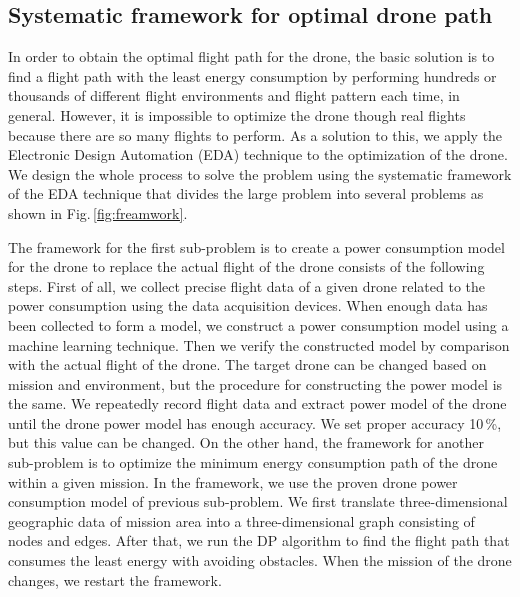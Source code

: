 \documentclass[journal]{./template/IEEEtran}
\begin{document}
\subsection {Systematic framework for optimal drone path}

In order to obtain the optimal flight path for the drone, the basic solution is to find a flight path with the least energy consumption by performing hundreds or thousands of different flight environments and flight pattern each time, in general.
However, it is impossible to optimize the drone though real flights because there are so many flights to perform.
As a solution to this, we apply the Electronic Design Automation (EDA) technique to the optimization of the drone.
We design the whole process to solve the problem using the systematic framework of the EDA technique that divides the large problem into several problems as shown in Fig.\,\ref{fig:freamwork}.

The framework for the first sub-problem is to create a power consumption model for the drone to replace the actual flight of the drone consists of the following steps.
First of all, we collect precise flight data of a given drone related to the power consumption using the data acquisition devices.
When enough data has been collected to form a model, we construct a power consumption model using a machine learning technique.
Then we verify the constructed model by comparison with the actual flight of the drone.
The target drone can be changed based on mission and environment, but the procedure for constructing the power model is the same. 
We repeatedly record flight data and extract power model of the drone until the drone power model has enough accuracy. 
We set proper accuracy 10\,\%, but this value can be changed. 
On the other hand, the framework for another sub-problem is to optimize the minimum energy consumption path of the drone within a given mission. 
In the framework, we use the proven drone power consumption model of previous sub-problem.
We first translate three-dimensional geographic data of mission area into a three-dimensional graph consisting of nodes and edges. After that, we run the DP algorithm to find the flight path that consumes the least energy with avoiding obstacles. 
When the mission of the drone changes, we restart the framework. 
\end{document}
